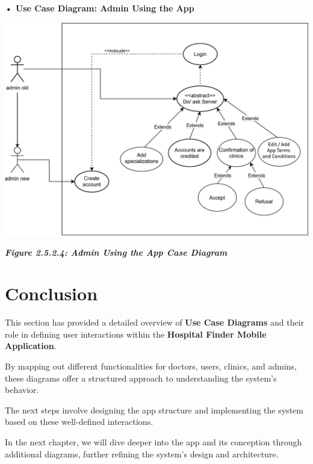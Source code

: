 \documentclass[12pt]{report}
\begin{document}
\vspace{0.5cm}
\noindent \textbf{• Use Case Diagram: Admin Using the App}
\vspace{0.6cm}
\begin{center}
	\includegraphics[width=\textwidth]{images/adminCAS.pdf} %
\end{center}
\vspace{-0.35cm}
\begin{center}
	\textit{\textbf{Figure 2.5.2.4: Admin Using the App Case Diagram}}
\end{center}

\newpage
\section{\textbf{Conclusion}}

\noindent This section has provided a detailed overview of \textbf{Use Case Diagrams} and their role in defining user interactions within the \textbf{Hospital Finder Mobile Application}.\vspace{0.5cm}

\noindent By mapping out different functionalities for doctors, users, clinics, and admins, these diagrams offer a structured approach to understanding the system's behavior.\vspace{0.5cm}

\noindent The next steps involve designing the app structure and implementing the system based on these well-defined interactions.\vspace{0.5cm}

\noindent In the next chapter, we will dive deeper into the app and its conception through additional diagrams, further refining the system's design and architecture.
\end{document}
